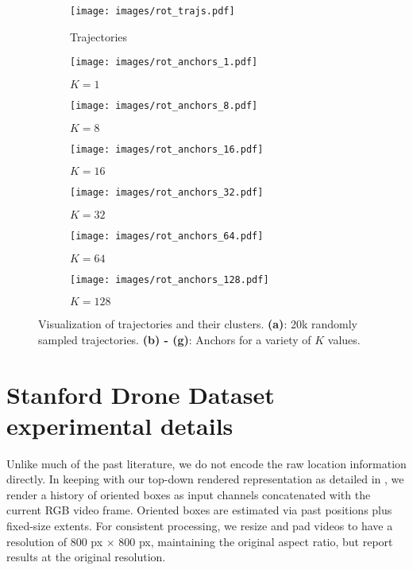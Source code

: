 \documentclass{article}
\begin{document}
\begin{figure*}[!htbp]
\centering
  \begin{subfigure}[b]{0.23\textwidth}
    \texttt{[image: images/rot\_trajs.pdf]}
    \caption{Trajectories}
  \end{subfigure}
  \begin{subfigure}[b]{0.23\textwidth}
    \texttt{[image: images/rot\_anchors\_1.pdf]}
    \caption{$K=1$}
  \end{subfigure}
  \begin{subfigure}[b]{0.23\textwidth}
    \texttt{[image: images/rot\_anchors\_8.pdf]}
    \caption{$K=8$}
  \end{subfigure}  
  \begin{subfigure}[b]{0.23\textwidth}
    \texttt{[image: images/rot\_anchors\_16.pdf]}
    \caption{$K=16$}
  \end{subfigure}  
  \begin{subfigure}[b]{0.23\textwidth}
    \texttt{[image: images/rot\_anchors\_32.pdf]}
    \caption{$K=32$}
  \end{subfigure}  
  \begin{subfigure}[b]{0.23\textwidth}
    \texttt{[image: images/rot\_anchors\_64.pdf]}
    \caption{$K=64$}
  \end{subfigure}  
  \begin{subfigure}[b]{0.23\textwidth}
    \texttt{[image: images/rot\_anchors\_128.pdf]}
    \caption{$K=128$}
  \end{subfigure}  
\caption{Visualization of trajectories and their clusters. \textbf{(a)}: 20k randomly sampled trajectories. \textbf{(b) - (g)}: Anchors for a variety of $K$ values.}
\label{fig:clusters_viz}
\end{figure*}

\section{Stanford Drone Dataset experimental details}
\label{sec:sdd_experiment_setup}

Unlike much of the past literature, we do not encode the raw location information directly.  In keeping with our top-down rendered representation as detailed in , we render a history of oriented boxes as input channels concatenated with the current RGB video frame. Oriented boxes are estimated via past positions plus fixed-size extents.  For consistent processing, we resize and pad videos to have a resolution of 800 px $\times$ 800 px, maintaining the original aspect ratio, but report results at the original resolution.
\end{document}
